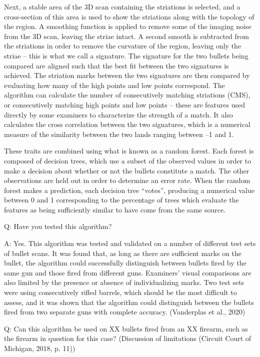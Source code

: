 \documentclass[print]{nuthesis}
\begin{document}
Next, a stable area of the 3D scan containing the striations is selected, and a cross-section of this area is used to show the striations along with the topology of the region.
A smoothing function is applied to remove some of the imaging noise from the 3D scan, leaving the striae intact.
A second smooth is subtracted from the striations in order to remove the curvature of the region, leaving only the striae -- this is what we call a signature.
The signature for the two bullets being compared are aligned such that the best fit between the two signatures is achieved.
The striation marks between the two signatures are then compared by evaluating how many of the high points and low points correspond.
The algorithm can calculate the number of consecutively matching striations (CMS), or consecutively matching high points and low points -- these are features used directly by some examiners to characterize the strength of a match.
It also calculates the cross correlation between the two signatures, which is a numerical measure of the similarity between the two lands ranging between --1 and 1.

These traits are combined using what is known as a random forest.
Each forest is composed of decision trees, which use a subset of the observed values in order to make a decision about whether or not the bullets constitute a match.
The other observations are held out in order to determine an error rate.
When the random forest makes a prediction, each decision tree ``votes'', producing a numerical value between 0 and 1 corresponding to the percentage of trees which evaluate the features as being sufficiently similar to have come from the same source.

Q: Have you tested this algorithm?

A: Yes.
This algorithm was tested and validated on a number of different test sets of bullet scans.
It was found that, as long as there are sufficient marks on the bullet, the algorithm could successfully distinguish between bullets fired by the same gun and those fired from different guns.
Examiners' visual comparisons are also limited by the presence or absence of individualizing marks.
Two test sets were using consecutively rifled barrels, which should be the most difficult to assess, and it was shown that the algorithm could distinguish between the bullets fired from two separate guns with complete accuracy. (Vanderplas et al., 2020)

Q: Can this algorithm be used on XX bullets fired from an XX firearm, such as the firearm in question for this case?
(Discussion of limitations (Circuit Court of Michigan, 2018, p. 11))
\end{document}
